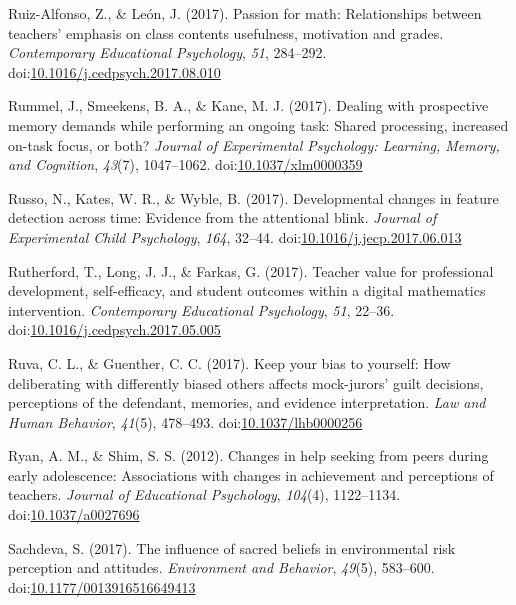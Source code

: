 \documentclass[english,man]{apa6}
\theoremstyle{definition}
\theoremstyle{definition}
\theoremstyle{definition}
\theoremstyle{remark}
\begin{document}
\hypertarget{ref-Ruiz-Alfonso2017}{}
Ruiz-Alfonso, Z., \& León, J. (2017). Passion for math: Relationships
between teachers' emphasis on class contents usefulness, motivation and
grades. \emph{Contemporary Educational Psychology}, \emph{51}, 284--292.
doi:\href{https://doi.org/10.1016/j.cedpsych.2017.08.010}{10.1016/j.cedpsych.2017.08.010}

\hypertarget{ref-Rummel2017}{}
Rummel, J., Smeekens, B. A., \& Kane, M. J. (2017). Dealing with
prospective memory demands while performing an ongoing task: Shared
processing, increased on-task focus, or both? \emph{Journal of
Experimental Psychology: Learning, Memory, and Cognition}, \emph{43}(7),
1047--1062.
doi:\href{https://doi.org/10.1037/xlm0000359}{10.1037/xlm0000359}

\hypertarget{ref-Russo2017}{}
Russo, N., Kates, W. R., \& Wyble, B. (2017). Developmental changes in
feature detection across time: Evidence from the attentional blink.
\emph{Journal of Experimental Child Psychology}, \emph{164}, 32--44.
doi:\href{https://doi.org/10.1016/j.jecp.2017.06.013}{10.1016/j.jecp.2017.06.013}

\hypertarget{ref-Rutherford2017}{}
Rutherford, T., Long, J. J., \& Farkas, G. (2017). Teacher value for
professional development, self-efficacy, and student outcomes within a
digital mathematics intervention. \emph{Contemporary Educational
Psychology}, \emph{51}, 22--36.
doi:\href{https://doi.org/10.1016/j.cedpsych.2017.05.005}{10.1016/j.cedpsych.2017.05.005}

\hypertarget{ref-Ruva2017}{}
Ruva, C. L., \& Guenther, C. C. (2017). Keep your bias to yourself: How
deliberating with differently biased others affects mock-jurors' guilt
decisions, perceptions of the defendant, memories, and evidence
interpretation. \emph{Law and Human Behavior}, \emph{41}(5), 478--493.
doi:\href{https://doi.org/10.1037/lhb0000256}{10.1037/lhb0000256}

\hypertarget{ref-Ryan2012}{}
Ryan, A. M., \& Shim, S. S. (2012). Changes in help seeking from peers
during early adolescence: Associations with changes in achievement and
perceptions of teachers. \emph{Journal of Educational Psychology},
\emph{104}(4), 1122--1134.
doi:\href{https://doi.org/10.1037/a0027696}{10.1037/a0027696}

\hypertarget{ref-Sachdeva2017}{}
Sachdeva, S. (2017). The influence of sacred beliefs in environmental
risk perception and attitudes. \emph{Environment and Behavior},
\emph{49}(5), 583--600.
doi:\href{https://doi.org/10.1177/0013916516649413}{10.1177/0013916516649413}
\end{document}
